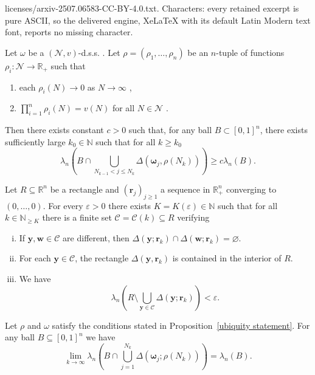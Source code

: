 \documentclass[10pt,a4paper]{amsart}
\newcommand{\N}{\mathbb N}%
\newcommand{\R}{\mathbb R}
\newcommand{\cN}{{\mathcal N}}
\begin{document}
licenses/arxiv-2507.06583-CC-BY-4.0.txt. Characters: every retained excerpt is pure ASCII, so the delivered engine, XeLaTeX with its default Latin Modern text font, reports no missing character.
\begin{proposition} \label{ubiquity statement}
    Let $\omega$ be a $(\cN,v)$-d.s.s. . Let $\rho=(\rho_{1},\dots,\rho_{n})$ be an $n$-tuple of functions $\rho_{i}:\cN \to \R_{+}$ such that
    \begin{enumerate}
        \item[i)] each $\rho_{i}(N)\to 0$ as $N\to \infty$ ,
        \item[ii)] $\prod_{i=1}^{n}\rho_{i}(N)=v(N)$ for all $N\in\cN$ .
    \end{enumerate}
    Then there exists constant $c>0$ such that, for any ball $B\subset [0,1]^{n}$, there exists sufficiently large $k_{0}\in\N$ such that for all $k\geq k_{0}$
    \begin{equation*}
        \lambda_n\left( B\cap \bigcup_{N_{k-1}<j\leq N_{k}}\Delta\left(\boldsymbol{\omega}_{j},\rho(N_{k})\right)\right) \geq c\lambda_n(B).
    \end{equation*}
\end{proposition}

\begin{proposition}\label{Prop:AlmostCover}
Let $R\subseteq \mathbb{R}^n$ be a rectangle and $(\mathbf{r}_j)_{j\geq 1}$ a sequence in $\mathbb{R}_{+}^n$ converging to $(0,\ldots,0)$. For every $\varepsilon>0$ there exists $K=K(\varepsilon)\in\N$ such that for all $k\in \N_{\geq K}$ there is a finite set $\mathcal{C}=\mathcal{C}(k)\subseteq R$ verifying
\begin{enumerate}[i.]
\item If $\mathbf{y},\mathbf{w}\in\mathcal{C}$ are different, then $\Delta(\mathbf{y};\mathbf{r}_k)\cap\Delta(\mathbf{w};\mathbf{r}_k)=\varnothing$.
\item For each $\mathbf{y}\in\mathcal{C}$, the rectangle $\Delta(\mathbf{y},\mathbf{r}_k)$ is contained in the interior of $R$.
\item We have
\[
\lambda_n\left( R\setminus \bigcup_{\mathbf{y}\in\mathcal{C}} \Delta(\mathbf{y};\mathbf{r}_{k})\right)< \varepsilon.
\]
\end{enumerate}
\end{proposition}

\begin{lemma}\label{uniform dirichlet}
Let $\rho$ and $\omega$ satisfy the conditions stated in Proposition~\ref{ubiquity statement}. For any ball $B\subseteq [0,1]^{n}$ we have
\[
\lim_{k\to\infty}
\lambda_n\left( B\cap\bigcup_{j=1}^{N_k} \Delta(\boldsymbol{\omega}_j;\rho(N_k))\right)
=
\lambda_n(B).
\]
\end{lemma}
\end{document}
